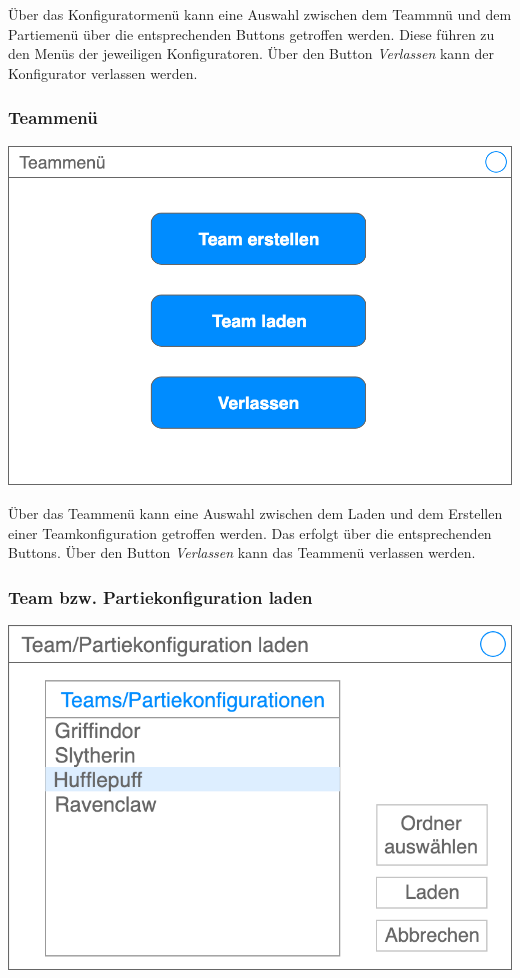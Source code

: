 \documentclass[a4paper,12pt,
headsepline,           %
oneside,               %
pointlessnumbers,      %
bibtotoc,              %
]{scrartcl}
\begin{document}
	Über das Konfiguratormenü kann eine Auswahl zwischen dem Teammnü und dem Partiemenü über die entsprechenden Buttons getroffen werden. Diese führen zu den Menüs der jeweiligen Konfiguratoren. Über den Button \textit{Verlassen} kann der Konfigurator verlassen werden.
	
	\subsubsection{Teammenü}
	
	\includegraphics[scale=0.2]{images/teammenue}
	
	Über das Teammenü kann eine Auswahl zwischen dem Laden und dem Erstellen einer Teamkonfiguration getroffen werden. Das erfolgt über die entsprechenden Buttons. Über den Button \textit{Verlassen} kann das Teammenü verlassen werden.
	
	\subsubsection{Team bzw. Partiekonfiguration laden}
	
	\includegraphics[scale=0.3]{images/laden}
	
\end{document}
